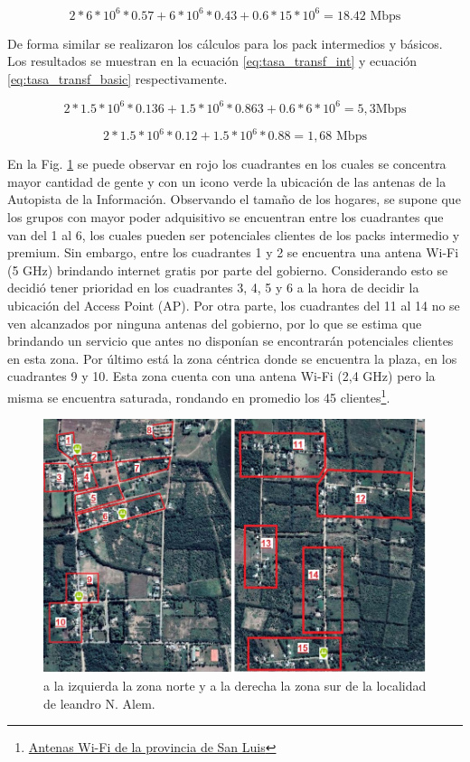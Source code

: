 \documentclass[11pt,a4paper]{article}
\begin{document}
\begin{equation}
  2*6*{10}^6*0.57+6*{10}^6*0.43+0.6*15*{10}^6=18.42 \text{ Mbps}
  \label{eq:tasa_transf_premium}
\end{equation}


De forma similar se realizaron los cálculos para los pack intermedios y básicos. 
Los resultados se muestran en la ecuación \ref{eq:tasa_transf_int} y ecuación \ref{eq:tasa_transf_basic} respectivamente. 


\begin{equation}
 2*1.5*{10}^6*0.136+1.5*{10}^6*0.863+ 0.6*6*{10}^6=5,3 \text{Mbps} 
 \label{eq:tasa_transf_int}
\end{equation}

\begin{equation}
 2*1.5*{10}^6*0.12+1.5*{10}^6*0.88=1,68 \text{ Mbps}
 \label{eq:tasa_transf_basic}
\end{equation}
 

 En la Fig. \ref{fig:cuadrantes_alem} se puede observar en rojo los cuadrantes en los cuales se concentra mayor cantidad de gente y con un icono verde la ubicación de las antenas de la Autopista de la Información. 
 Observando el tamaño de los hogares, se supone que los grupos con mayor poder adquisitivo se encuentran entre los cuadrantes que van del 1 al 6, los cuales pueden ser potenciales clientes de los packs intermedio y premium. 
 Sin embargo, entre los cuadrantes 1 y 2 se encuentra una antena Wi-Fi (5 GHz) brindando internet gratis por parte del gobierno. 
 Considerando esto se decidió tener prioridad en los cuadrantes 3, 4, 5 y 6 a la hora de decidir la ubicación del Access Point (AP). Por otra parte, los cuadrantes del 11 al 14 no se ven alcanzados por ninguna antenas del gobierno, por lo que se estima que brindando un servicio que antes no disponían se encontrarán potenciales clientes en esta zona. 
 Por último está la zona céntrica donde se encuentra la plaza, en los cuadrantes 9 y 10. Esta zona cuenta con una antena Wi-Fi (2,4 GHz) pero la misma se encuentra saturada, rondando en promedio los 45 clientes\footnote{\href{http://wifi.sanluis.gov.ar/}{Antenas Wi-Fi de la provincia de San Luis}}.


\begin{figure}[htbp]
  \centering
  \includegraphics[width=0.8\linewidth]{fotos_ema/cuadrantes_alem.jpg}
  \caption{a la izquierda la zona norte y a la derecha la zona sur de la localidad de leandro N. Alem.}
  \label{fig:cuadrantes_alem}
\end{figure}
\end{document}
